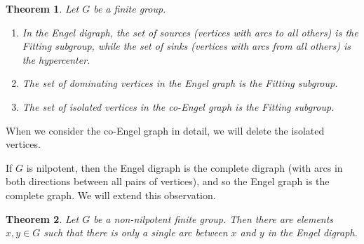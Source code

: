 \documentclass[reqno,12pt]{amsart}
\theoremstyle{plain}
\newtheorem{thm}{Theorem}[section]
\theoremstyle{definition}
\begin{document}
\begin{thm} Let $G$ be a finite group.
\begin{enumerate}
\item In the Engel digraph, the set of sources (vertices with arcs to all
others) is the Fitting subgroup, while the set of sinks (vertices with arcs
from all others) is the hypercenter.
\item The set of dominating vertices in the Engel graph is the Fitting
subgroup.
\item The set of isolated vertices in the co-Engel graph is the Fitting
subgroup.
\end{enumerate}
\end{thm}

When we consider the co-Engel graph in detail, we will delete the isolated
vertices.

If $G$ is nilpotent, then the Engel digraph is the complete digraph (with arcs
in both directions between all pairs of vertices), and so the Engel graph
is the complete graph. We will extend this observation.

\begin{thm}
Let $G$ be a non-nilpotent finite group. Then there are elements $x,y\in G$
such that there is only a single arc between $x$ and $y$ in the Engel digraph.
\label{t:single}
\end{thm}
\end{document}
